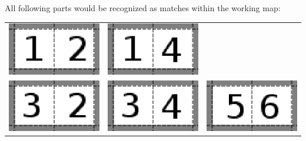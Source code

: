 All following parts would be recognized as matches within the working map:
\begin{table}[h!]
        \begin{tabular}{c c c}
		\includegraphics[scale=1]{Example/AbstractInput/12.eps} & \includegraphics[scale=1]{Example/AbstractInput/14.eps} & \\
		\includegraphics[scale=1]{Example/AbstractInput/32.eps} & \includegraphics[scale=1]{Example/AbstractInput/34.eps} & \includegraphics[scale=1]{Example/AbstractInput/56.eps} \\
		\end{tabular}
\end{table}
